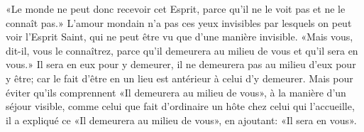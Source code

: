«Le monde ne peut donc recevoir cet Esprit,
	parce qu’il ne le voit pas et ne le connaît pas.»
L’amour mondain n’a pas ces yeux invisibles
	par lesquels on peut voir l’Esprit Saint,
	qui ne peut être vu que d’une manière invisible.
«Mais vous, dit-il, vous le connaîtrez,
	parce qu’il demeurera au milieu de vous et qu’il sera en vous.»
Il sera en eux pour y demeurer,
	il ne demeurera pas au milieu d’eux pour y être;
	car le fait d’être en un lieu est antérieur à celui d’y demeurer.
Mais pour éviter qu’ils comprennent «Il demeurera au milieu de vous»,
	à la manière d’un séjour visible,
	comme celui que fait d’ordinaire un hôte chez celui qui l’accueille,
	il a expliqué ce «Il demeurera au milieu de vous»,
	en ajoutant: «Il sera en vous».

